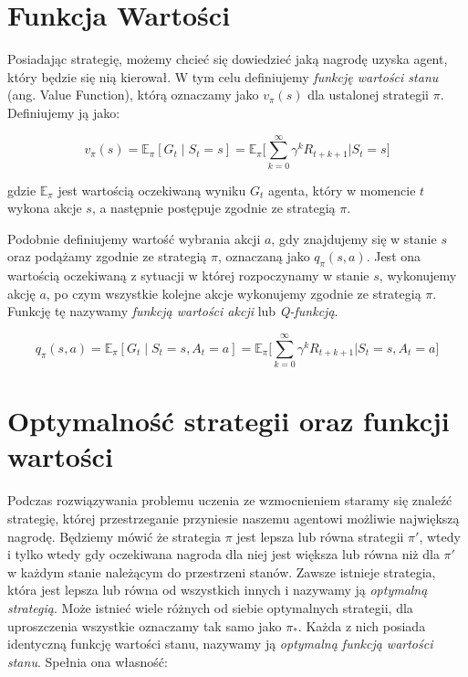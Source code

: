 \documentclass[licencjacka]{pracamgr}
\begin{document}
\section{Funkcja Wartości}

Posiadając strategię, możemy chcieć się dowiedzieć jaką nagrodę uzyska agent, który będzie się nią kierował. W tym celu definiujemy \emph{funkcję wartości stanu} (ang. Value Function), którą oznaczamy jako $ v_{\pi}(s) $ dla ustalonej strategii $ \pi $. Definiujemy ją jako:

$$ v_{\pi}(s) = \mathbb{E}_{\pi}[G_t \mid S_t = s] = \mathbb{E}_{\pi} \Bigg[ \sum_{k=0}^{\infty} \gamma^k R_{t+k+1} \bigg| S_t = s \Bigg] $$

gdzie $ \mathbb{E}_{\pi} $ jest wartością oczekiwaną wyniku $ G_t $ agenta, który w momencie $t$ wykona akcje $s$, a następnie postępuje zgodnie ze strategią $\pi$.

Podobnie definiujemy wartość wybrania akcji $a$, gdy znajdujemy się w stanie $s$ oraz podążamy zgodnie ze strategią $\pi$, oznaczaną jako $q_{\pi}(s, a)$. Jest ona wartością oczekiwaną z sytuacji w której rozpoczynamy w stanie $s$, wykonujemy akcję $a$, po czym wszystkie kolejne akcje wykonujemy zgodnie ze strategią $\pi$. Funkcję tę nazywamy \emph{funkcją wartości akcji} lub \emph{Q-funkcją}.

$$ q_{\pi}(s, a) = \mathbb{E}_{\pi}[G_t \mid S_t = s, A_t = a] = \mathbb{E}_{\pi} \Bigg[ \sum_{k=0}^{\infty} \gamma^k R_{t+k+1} \bigg| S_t = s, A_t = a \Bigg] $$

\section{Optymalność strategii oraz funkcji wartości}

Podczas rozwiązywania problemu uczenia ze wzmocnieniem staramy się znaleźć strategię, której przestrzeganie przyniesie naszemu agentowi możliwie największą nagrodę. Będziemy mówić że strategia $\pi$ jest lepsza lub równa strategii $\pi'$, wtedy i tylko wtedy gdy oczekiwana nagroda dla niej jest większa lub równa niż dla $\pi'$ w każdym stanie należącym do przestrzeni stanów. Zawsze istnieje strategia, która jest lepsza lub równa od wszystkich innych i nazywamy ją \emph{optymalną strategią}. Może istnieć wiele różnych od siebie optymalnych strategii, dla uproszczenia wszystkie oznaczamy tak samo jako $\pi_{\ast}$. Każda z nich posiada identyczną funkcję wartości stanu, nazywamy ją \emph{optymalną funkcją wartości stanu}. Spełnia ona własność:
\end{document}

